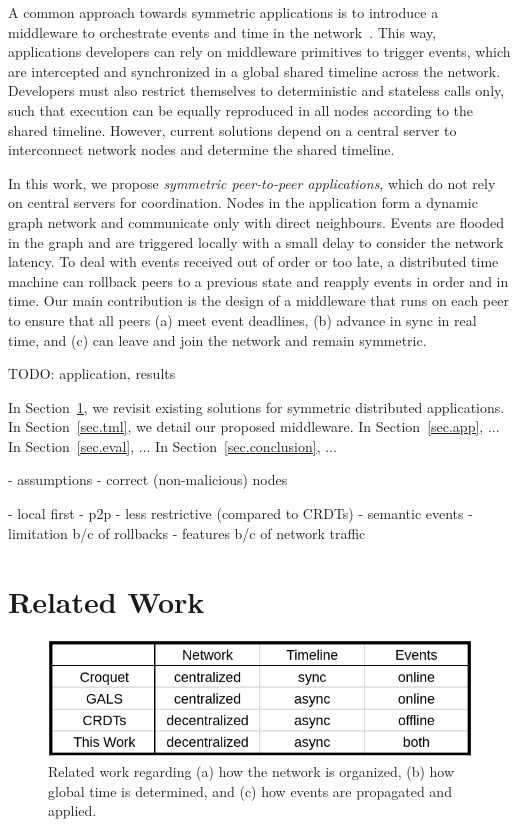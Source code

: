 \documentclass[10pt,journal,compsoc]{IEEEtran}
\begin{document}
A common approach towards symmetric applications is to introduce a middleware
to orchestrate events and time in the network~\cite{gals,croquet}.
This way, applications developers can rely on middleware primitives to trigger
events, which are intercepted and synchronized in a global shared timeline
across the network.
Developers must also restrict themselves to deterministic and stateless calls
only, such that execution can be equally reproduced in all nodes according to
the shared timeline.
However, current solutions depend on a central server to interconnect network
nodes and determine the shared timeline.

In this work, we propose \emph{symmetric peer-to-peer applications}, which
do not rely on central servers for coordination.
Nodes in the application form a dynamic graph network and communicate only
with direct neighbours.
Events are flooded in the graph and are triggered locally with a small delay
to consider the network latency.
To deal with events received out of order or too late, a distributed time
machine can rollback peers to a previous state and reapply events in order and
in time.
Our main contribution is the design of a middleware that runs on each peer to
ensure that all peers
    (a) meet event deadlines,
    (b) advance in sync in real time, and
    (c) can leave and join the network and remain symmetric.

TODO: application, results

In Section~\ref{sec.related}, we revisit existing solutions for symmetric
distributed applications.
In Section~\ref{sec.tml}, we detail our proposed middleware.
In Section~\ref{sec.app}, ...
In Section~\ref{sec.eval}, ...
In Section~\ref{sec.conclusion}, ...

- assumptions
    - correct (non-malicious) nodes

- local first
- p2p
- less restrictive (compared to CRDTs)
- semantic events
    - limitation b/c of rollbacks
    - features b/c of network traffic

\section{Related Work}
\label{sec.related}

\begin{figure}[t]
  \centering
  \includegraphics[width=\linewidth]{table}
  \caption{
    Related work regarding
        (a) how the network is organized,
        (b) how global time is determined, and
        (c) how events are propagated and applied.
    \label{fig.table}
  }
\end{figure}
\end{document}
